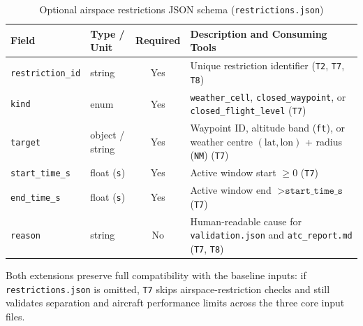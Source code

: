 \begin{table}[H]
\centering
\caption{Optional airspace restrictions JSON schema (\texttt{restrictions.json})}
\label{tab:restrictions-schema}
\footnotesize
\setlength{\tabcolsep}{4pt}
\begin{tabularx}{\linewidth}{@{}l l c >{\raggedright\arraybackslash}X@{}}
\toprule
\textbf{Field} & \textbf{Type / Unit} & \textbf{Required} & \textbf{Description and Consuming Tools} \\
\midrule
\texttt{restriction\_id} & string & Yes & Unique restriction identifier (\texttt{T2}, \texttt{T7}, \texttt{T8}) \\
\texttt{kind} & enum & Yes & \texttt{weather\_cell}, \texttt{closed\_waypoint}, or \texttt{closed\_flight\_level} (\texttt{T7}) \\
\texttt{target} & object / string & Yes & Waypoint ID, altitude band (\texttt{ft}), or weather centre $(\text{lat}, \text{lon})$ + radius (\texttt{NM}) (\texttt{T7}) \\
\texttt{start\_time\_s} & float (\texttt{s}) & Yes & Active window start $\ge 0$ (\texttt{T7}) \\
\texttt{end\_time\_s} & float (\texttt{s}) & Yes & Active window end $> \texttt{start\_time\_s}$ (\texttt{T7}) \\
\texttt{reason} & string & No & Human-readable cause for \texttt{validation.json} and \texttt{atc\_report.md} (\texttt{T7}, \texttt{T8}) \\
\bottomrule
\end{tabularx}
\end{table}

Both extensions preserve full compatibility with the baseline inputs: if \texttt{restrictions.json} is omitted, \texttt{T7} skips airspace-restriction checks and still validates separation and aircraft performance limits across the three core input files.
\endgroup
